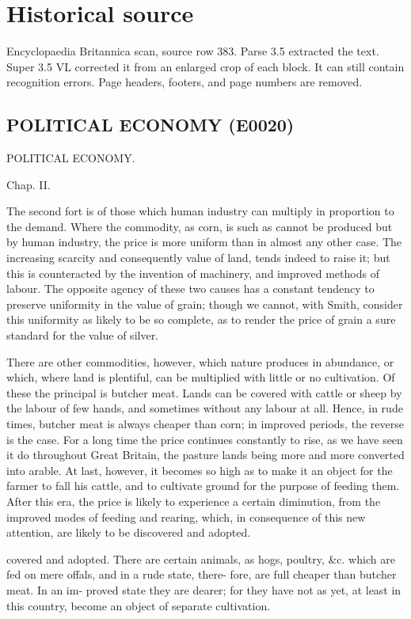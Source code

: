 \documentclass{article}
\begin{document}
\section*{Historical source}
Encyclopaedia Britannica scan, source row 383. Parse 3.5 extracted the text. Super 3.5 VL corrected it from an enlarged crop of each block. It can still contain recognition errors.
Page headers, footers, and page numbers are removed.

\subsection*{POLITICAL ECONOMY (E0020)}
POLITICAL ECONOMY.

Chap. II.

The second fort is of those which human industry can multiply in proportion to the demand. Where the commodity, as corn, is such as cannot be produced but by human industry, the price is more uniform than in almost any other case. The increasing scarcity and consequently value of land, tends indeed to raise it; but this is counteracted by the invention of machinery, and improved methods of labour. The opposite agency of these two causes has a constant tendency to preserve uniformity in the value of grain; though we cannot, with Smith, consider this uniformity as likely to be so complete, as to render the price of grain a sure standard for the value of silver.

There are other commodities, however, which nature produces in abundance, or which, where land is plentiful, can be multiplied with little or no cultivation. Of these the principal is butcher meat. Lands can be covered with cattle or sheep by the labour of few hands, and sometimes without any labour at all. Hence, in rude times, butcher meat is always cheaper than corn; in improved periods, the reverse is the case. For a long time the price continues constantly to rise, as we have seen it do throughout Great Britain, the pasture lands being more and more converted into arable. At last, however, it becomes so high as to make it an object for the farmer to fall his cattle, and to cultivate ground for the purpose of feeding them. After this era, the price is likely to experience a certain diminution, from the improved modes of feeding and rearing, which, in consequence of this new attention, are likely to be discovered and adopted.

covered and adopted.
There are certain animals, as hogs, poultry, \&c.
which are fed on mere offals, and in a rude state, there-
fore, are full cheaper than butcher meat. In an im-
proved state they are dearer; for they have not as yet,
at least in this country, become an object of separate
cultivation.
\end{document}
